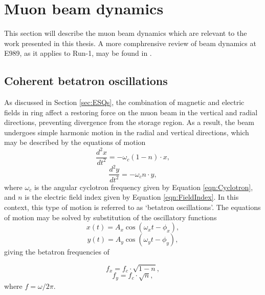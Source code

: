 \section{Muon beam dynamics}\label{sec:BeamDynamics}

This section will describe the muon beam dynamics which are relevant to the work presented in this thesis. A more comphrensive review of beam dynamics at E989, as it applies to Run-1, may be found in \cite{BeamDynamics}.

\subsection{Coherent betatron oscillations}\label{subsec:CBO}

As discussed in Section \ref{sec:ESQs}, the combination of magnetic and electric fields in ring affect a restoring force on the muon beam in the vertical and radial directions, preventing divergence from the storage region. As a result, the beam undergoes simple harmonic motion in the radial and vertical directions, which may be described by the equations of motion 
%
\begin{equation}
  \frac{d^{2}x}{dt^{2}} = -\omega_{c}(1-n)\cdot x,
  \label{eqn:EOM_BOx}
\end{equation}
%
%
\begin{equation}
  \frac{d^{2}y}{dt^{2}} = -\omega_{c}n\cdot y,
  \label{eqn:EOM_BOy}
\end{equation}
%
where $\omega_{c}$ is the angular cyclotron frequency given by Equation \ref{eqn:Cyclotron}, and $n$ is the electric field index given by Equation \ref{eqn:FieldIndex}. In this context, this type of motion is referred to as `betatron oscillations'. The equations of motion may be solved by substitution of the oscillatory functions
%
\begin{equation}
  x(t) = A_{x}\cos(\omega_{x}t-\phi_{x}),
  \label{eqn:SLN_BOx}
\end{equation}
%
\begin{equation}
  y(t) = A_{y}\cos(\omega_{y}t-\phi_{y}),
  \label{eqn:SLN_BOy}
\end{equation}
%
giving the betatron frequencies of  

\begin{equation}
  f_{x} = f_{c}\cdot\sqrt{1-n},
  \label{eqn:omegaBOx}
\end{equation}
%
\begin{equation}
  f_{y} = f_{c}\cdot\sqrt{n},
  \label{eqn:omegaBOy}
\end{equation}
%
where $f = \omega/2\pi$. 

